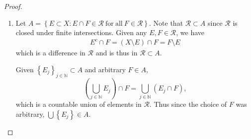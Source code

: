 \documentclass{article}
\theoremstyle{definition}
\begin{document}
\begin{proof}
\begin{enumerate}[label=\textbf{\alph*.}]
		      Let $\left\lbrace E_n \right\rbrace_{n \in \mathbb{N}} \subset A$, and express this set as the union of two sets, namely \begin{equation*}
			      \left\lbrace E_n \right\rbrace_{n \in \mathbb{N}} = \left\lbrace F_j \right\rbrace_{j \in J} \cup \left\lbrace G_k \right\rbrace_{k \in K}
		      \end{equation*}
		      where $\left\lbrace F_j \right\rbrace_{j \in J} \subset A$ is the collection of all sets in $A$ who are members of $\mathscr{R}$ and $\left\lbrace G_k \right\rbrace_{k \in K} \subset A$ is the collection of sets in $A$ who are not themselves in $\mathscr{R}$, but whose complements are.
		      Then
		      \begin{align*}
			      \bigcup_{n \in \mathbb{N}} E_n & = \bigcup_{j \in J} F_j \cup \bigcup_{k \in K} G_k                            \\
			                                     & = \bigcup_{j \in J} F_j \cup \left( \bigcap_{k \in K} G_k^c \right)^c \tag{1}
		      \end{align*}
		      Since each $F_j$ is in $\mathscr{R}$, $\bigcup_{j \in J} F_j \in \mathscr{R} \subset A$.
		      Also, we know from (a) that $\sigma$-rings are closed under countable intersections, so since $G_k^c \in R$ for each $G_k$, we have $\bigcap_{k \in K}G_k^c \in R$.
		      Its complement is also in $R$ since $R$ is closed under complementation.
		      Thus (2) is a union of two members of $R$, and is therefore in $R \subset A$.

		\item Let $A = \left\lbrace E \subset X : E \cap F \in \mathscr{R} \ \mathrm{for\ all} \ F \in \mathscr{R} \right\rbrace$.
		      Note that $\mathscr{R} \subset A$ since $\mathscr{R}$ is closed under finite intersections.
		      Given any $E, F \in \mathscr{R}$, we have \begin{align*}
			      E^c \cap F = \left( X \setminus E \right) \cap F = F \setminus E
		      \end{align*}
		      which is a difference in $\mathscr{R}$ and is thus in $\mathscr{R} \subset A$.

		      Given $\left\lbrace E_j \right\rbrace_{j \in \mathbb{N}} \subset A$ and arbitrary $F \in A$, \begin{equation*}
			      \left( \bigcup_{j \in \mathbb{N}} E_j \right) \cap F = \bigcup_{j \in \mathbb{N}} \left( E_j \cap F \right),
		      \end{equation*}
		      which is a countable union of elements in $\mathscr{R}$.
		      Thus since the choice of $F$ was arbitrary, $\bigcup \left\lbrace E_j \right\rbrace \in A$.
	\end{enumerate}
\end{proof}
\end{document}
